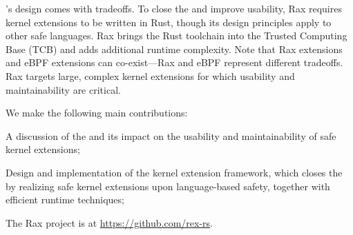 \vspace{-2.5pt}
\projname{}'s design comes with tradeoffs.
To close the \gap{} and improve usability, Rax requires kernel extensions to be written in Rust,
    though its design principles apply to other safe languages.
Rax brings the Rust toolchain into the Trusted Computing Base (TCB)
    and adds additional runtime complexity.
Note that Rax extensions and eBPF extensions can co-exist---Rax and eBPF
    represent different tradeoffs.
Rax targets large, complex kernel extensions for which usability
    and maintainability are critical.

 We make the following main contributions:
\begin{packed_itemize}
    \item A discussion of the \gap{}
      and its impact on the usability and maintainability of safe kernel extensions;
    \item Design and implementation of the \projname{} kernel extension framework,
        which closes the \gap{} by realizing safe kernel extensions
        upon language-based safety,
        together with efficient runtime techniques;
    \item The Rax project is at \url{https://github.com/rex-rs}.
\end{packed_itemize}
